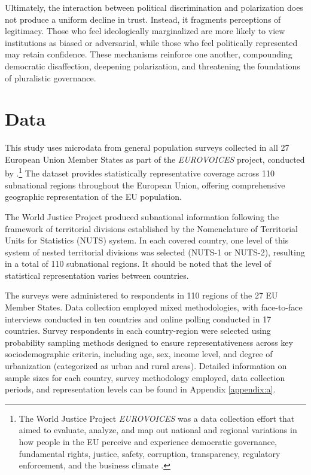\documentclass{article}
\begin{document}
Ultimately, the interaction between political discrimination and polarization does not produce a uniform decline in trust. Instead, it fragments perceptions of legitimacy. Those who feel ideologically marginalized are more likely to view institutions as biased or adversarial, while those who feel politically represented may retain confidence. These mechanisms reinforce one another, compounding democratic disaffection, deepening polarization, and threatening the foundations of pluralistic governance.

\section{Data}

This study uses microdata from general population surveys collected in all 27 European Union Member States as part of the \emph{EUROVOICES} project, conducted by \textcite{the_world_justice_project}.\footnote{The World Justice Project \emph{EUROVOICES} was a data collection effort that aimed to evaluate, analyze, and map out national and regional variations in how people in the EU perceive and experience democratic governance, fundamental rights, justice, safety, corruption, transparency, regulatory enforcement, and the business climate \parencite{the_world_justice_project}.} The dataset provides statistically representative coverage across 110 subnational regions throughout the European Union, offering comprehensive geographic representation of the EU population.

The World Justice Project produced subnational information following the framework of territorial divisions established by the Nomenclature of Territorial Units for Statistics (NUTS) system. In each covered country, one level of this system of nested territorial divisions was selected (NUTS-1 or NUTS-2), resulting in a total of 110 subnational regions. It should be noted that the level of statistical representation varies between countries.

The surveys were administered to respondents in 110 regions of the 27 EU Member States. Data collection employed mixed methodologies, with face-to-face interviews conducted in ten countries and online polling conducted in 17 countries. Survey respondents in each country-region were selected using probability sampling methods designed to ensure representativeness across key sociodemographic criteria, including age, sex, income level, and degree of urbanization (categorized as urban and rural areas). Detailed information on sample sizes for each country, survey methodology employed, data collection periods, and representation levels can be found in Appendix \ref{appendix:a}.
\end{document}
